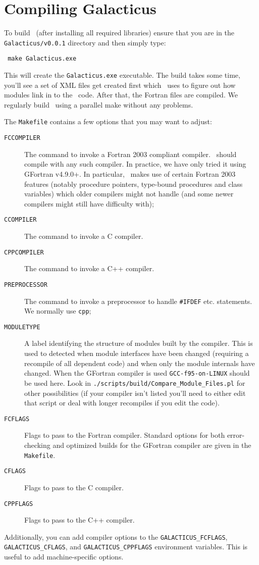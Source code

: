 \section{Compiling Galacticus}

To build \glc\ (after installing all required libraries) ensure that you are in the {\tt Galacticus/v0.0.1} directory and then simply type:
\begin{verbatim}
 make Galacticus.exe
\end{verbatim}
This will create the {\tt Galacticus.exe} executable. The build takes some time, you'll see a set of XML files get created first which \glc\ uses to figure out how modules link in to the \glc\ code. After that, the Fortran files are compiled. We regularly build \glc\ using a parallel make without any problems.

The {\tt Makefile} contains a few options that you may want to adjust:
\begin{description}
 \item[{\tt FCCOMPILER}] The command to invoke a Fortran 2003 compliant compiler. \glc\ should compile with any such compiler. In practice, we have only tried it using {\sc GFortran} v4.9.0+. In particular, \glc\ makes use of certain Fortran 2003 features (notably procedure pointers, type-bound procedures and class variables) which older compilers might not handle (and some newer compilers might still have difficulty with);
 \item[{\tt CCOMPILER}] The command to invoke a C compiler.
 \item[{\tt CPPCOMPILER}] The command to invoke a C++ compiler.
 \item[{\tt PREPROCESSOR}] The command to invoke a preprocessor to handle {\tt \#IFDEF} etc. statements. We normally use {\tt cpp};
 \item[{\tt MODULETYPE}] A label identifying the structure of modules built by the compiler. This is used to detected when module interfaces have been changed (requiring a recompile of all dependent code) and when only the module internals have changed. When the {\sc GFortran} compiler is used {\tt GCC-f95-on-LINUX} should be used here. Look in {\tt ./scripts/build/Compare\_Module\_Files.pl} for other possibilities (if your compiler isn't listed you'll need to either edit that script or deal with longer recompiles if you edit the code).
 \item[{\tt FCFLAGS}] Flags to pass to the Fortran compiler. Standard options for both error-checking and optimized builds for the {\sc GFortran} compiler are given in the {\tt Makefile}.
 \item[{\tt CFLAGS}] Flags to pass to the C compiler.
 \item[{\tt CPPFLAGS}] Flags to pass to the C++ compiler.
\end{description}
Additionally, you can add compiler options to the {\tt GALACTICUS\_FCFLAGS}, {\tt GALACTICUS\_CFLAGS}, and {\tt GALACTICUS\_CPPFLAGS} environment variables. This is useful to add machine-specific options.

